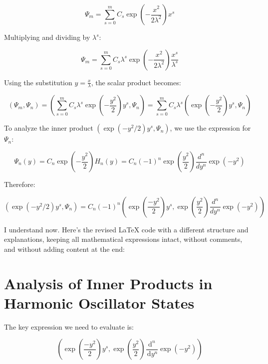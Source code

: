 \begin{equation}
\Psi_m = \sum_{s=0}^m C_s\exp\left(-\frac{x^2}{2\lambda^2}\right)x^s
\end{equation}

Multiplying and dividing by $\lambda^s$:

\begin{equation}
\Psi_m = \sum_{s=0}^m C_s\lambda^s\exp\left(-\frac{x^2}{2\lambda^2}\right)\frac{x^s}{\lambda^s}
\end{equation}

Using the substitution $y = \frac{x}{\lambda}$, the scalar product becomes:

\begin{equation}
(\Psi_m, \Psi_n) = \left(\sum_{s=0}^m C_s\lambda^s\exp\left(-\frac{y^2}{2}\right)y^s, \Psi_n\right) = \sum_{s=0}^m C_s\lambda^s\left(\exp\left(-\frac{y^2}{2}\right)y^s, \Psi_n\right)
\end{equation}

To analyze the inner product $\left(\exp\left(-y^2/2\right)y^s, \Psi_n\right)$, we use the expression for $\Psi_n$:

\begin{equation}
\Psi_n(y) = C_n\exp\left(-\frac{y^2}{2}\right)H_n(y) = C_n(-1)^n\exp\left(\frac{y^2}{2}\right)\frac{d^n}{dy^n}\exp(-y^2)
\end{equation}

Therefore:

\begin{equation}
\left(\exp\left(-y^2/2\right)y^s, \Psi_n\right) = C_n(-1)^n\left(\exp\left(\frac{-y^2}{2}\right)y^s, \exp\left(\frac{y^2}{2}\right)\frac{d^n}{dy^n}\exp(-y^2)\right)
\end{equation}

I understand now. Here's the revised LaTeX code with a different structure and explanations, keeping all mathematical expressions intact, without comments, and without adding content at the end:


\section{Analysis of Inner Products in Harmonic Oscillator States}

The key expression we need to evaluate is:

\begin{equation}
\left(\exp \left(\frac{-y^{2}}{2}\right) y^{s}, \exp \left(\frac{y^{2}}{2}\right) \frac{\mathrm{d}^{n}}{\, \mathrm{d} y^{n}} \exp \left(-y^{2}\right)\right)
\end{equation}

